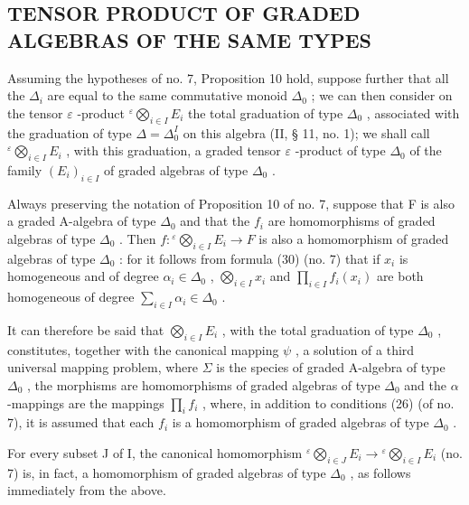 \subsection{TENSOR PRODUCT OF GRADED ALGEBRAS OF THE SAME TYPES}

Assuming the hypotheses of no. 7, Proposition 10 hold, suppose further that all the \(\Delta_{i}\) are equal to the same commutative monoid \(\Delta_{0}\) ; we can then consider on the tensor \(\varepsilon\) -product \({}^{\varepsilon}\bigotimes_{i\in I}E_{i}\) the total graduation of type \(\Delta_{0}\) , associated with the graduation of type \(\Delta = \Delta_{0}^{I}\) on this algebra (II, § 11, no. 1); we shall call \({}^{\varepsilon}\bigotimes_{i\in I}E_{i}\) , with this graduation, a graded tensor \(\varepsilon\) -product of type \(\Delta_{0}\) of the family \((E_{i})_{i\in I}\) of graded algebras of type \(\Delta_{0}\) .

Always preserving the notation of Proposition 10 of no. 7, suppose that F is also a graded A-algebra of type \(\Delta_0\) and that the \(f_i\) are homomorphisms of graded algebras of type \(\Delta_0\) . Then \(f: {}^{\varepsilon}\bigotimes_{i \in I} E_i \to F\) is also a homomorphism of graded algebras of type \(\Delta_0\) : for it follows from formula (30) (no. 7) that if \(x_i\) is homogeneous and of degree \(\alpha_i \in \Delta_0\) , \(\bigotimes_{i \in I} x_i\) and \(\prod_{i \in I} f_i(x_i)\) are both homogeneous of degree \(\sum_{i \in I} \alpha_i \in \Delta_0\) .

It can therefore be said that \(\bigotimes_{i\in I}E_i\) , with the total graduation of type \(\Delta_0\) , constitutes, together with the canonical mapping \(\psi\) , a solution of a third universal mapping problem, where \(\Sigma\) is the species of graded A-algebra of type \(\Delta_0\) , the morphisms are homomorphisms of graded algebras of type \(\Delta_0\) and the \(\alpha\) -mappings are the mappings \(\prod_{i}f_{i}\) , where, in addition to conditions (26) (of no. 7), it is assumed that each \(f_{i}\) is a homomorphism of graded algebras of type \(\Delta_0\) .

For every subset J of I, the canonical homomorphism \({}^{\varepsilon}\bigotimes_{i\in J}E_i\to {}^{\varepsilon}\bigotimes_{i\in I}E_i\) (no. 7) is, in fact, a homomorphism of graded algebras of type \(\Delta_0\) , as follows immediately from the above.


